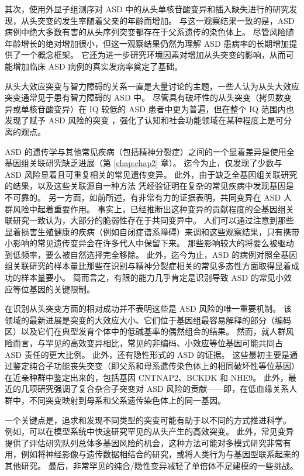 其次，使用外显子组测序对 ASD 中的从头单核苷酸变异和插入缺失进行的研究发现，从头突变的发生率随着父亲的年龄而增加。
与这一观察结果一致的是，ASD 病例中绝大多数有害的从头序列突变都存在于父系遗传的染色体上。
尽管风险随年龄增长的绝对增加很小，但这一观察结果仍然为理解 ASD 患病率的长期增加提供了一个概念框架。
它还为进一步研究环境因素对增加从头突变的影响，从而可能增加临床 ASD 病例的真实发病率奠定了基础。


从头大效应突变与智力障碍的关系一直是大量讨论的主题，一些人认为从头大效应突变通常见于患有智力障碍的 ASD 中。
尽管具有破坏性的从头突变（拷贝数变异或单核苷酸变异）在 IQ 较低的 ASD 患者中更为普遍，但在整个 IQ 范围内也发现了赋予 ASD 风险的突变 ，强化了认知和社会功能领域在某种程度上是可分离的观点。


ASD 的遗传学与其他常见疾病（包括精神分裂症）之间的一个显着差异是使用全基因组关联研究缺乏进展（第 \ref{chap:chap2} 章）。
迄今为止，仅发现了少数与 ASD 风险显着且可重复相关的常见遗传变异。
此外，由于缺乏全基因组关联研究的结果，以及这些关联源自一种方法 凭经验证明在复杂的常见疾病中发现基因是不可靠的。
另一方面，如前所述，有非常有力的证据表明，共同变异在 ASD 人群风险中起着重要作用。
事实上，已经推断出这种变异的贡献程度的全基因组关联研究一致认为，大部分的脆弱性存在于共同变异中。
人们可以通过注意到那些显着损害生殖健康的疾病（例如自闭症谱系障碍）来调和这些观察结果，只有携带小影响的常见遗传变异会在许多代人中保留下来。
那些影响较大的将要么被驱动到低频率，要么被自然选择完全移除。
此外，迄今为止，ASD 的病例对照全基因组关联研究的样本量比那些在识别与精神分裂症相关的常见多态性方面取得显着成功的样本量要小。
简而言之，有限的能力几乎肯定是识别导致 ASD 的常见小效应等位基因的关键限制。


在识别从头突变方面的相对成功并不表明这些是 ASD 风险的唯一重要机制。
该领域的最新进展是突变的大效应大小、它们位于基因组最容易解释的部分（编码区）以及它们在典型发育个体中的低碱基率的偶然组合的结果。
然而，就人群风险而言，与罕见的高效变异相比，常见的非编码、小效应等位基因可能共同占 ASD 责任的更大比例。
此外，还有隐性形式的 ASD 的证据。 这些最初主要是通过鉴定纯合子功能丧失突变（即父系和母系遗传染色体上的相同破坏性等位基因）在近亲种群中鉴定出来的，包括基因 CNTNAP2、BCKDK 和 NHE9。 此外，最近的几项研究强调了复合杂合子突变对 ASD 风险的贡献——即，在低血缘关系人群中，不同突变映射到母系和父系遗传染色体上的同一基因。

一个关键点是，追求和发现不同类型的突变可能有助于以不同的方式推进科学。 例如，可以在模型系统中快速研究罕见的从头产生的高效突变。 此外，常见变异提供了评估研究队列总体多基因风险的机会，这种方法可能对多模式研究非常有用，例如将神经影像与遗传数据相结合的研究，或将人类行为与基因型联系起来的其他研究。 最后，非常罕见的纯合/隐性变异减轻了单倍体不足建模的一些挑战。

